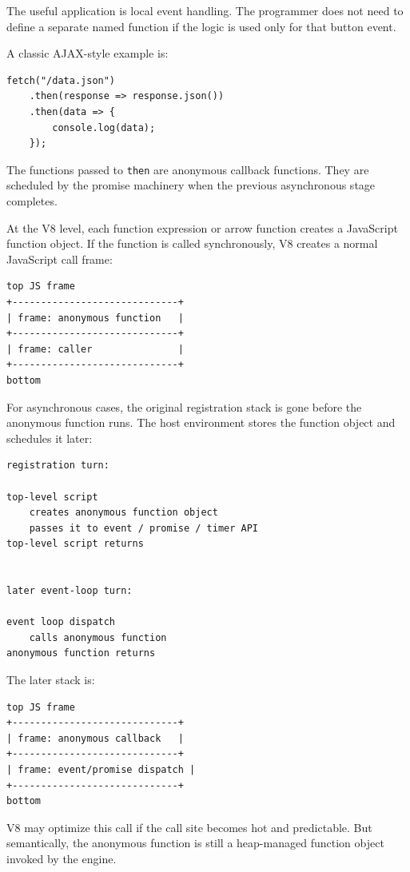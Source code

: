 The useful application is local event handling. The programmer does not need to define a separate named function if the logic is used only for that button event.

A classic AJAX-style example is:

\begin{verbatim}
fetch("/data.json")
    .then(response => response.json())
    .then(data => {
        console.log(data);
    });
\end{verbatim}

The functions passed to \texttt{then} are anonymous callback functions. They are scheduled by the promise machinery when the previous asynchronous stage completes.

At the V8 level, each function expression or arrow function creates a JavaScript function object. If the function is called synchronously, V8 creates a normal JavaScript call frame:

\begin{verbatim}
top JS frame
+-----------------------------+
| frame: anonymous function   |
+-----------------------------+
| frame: caller               |
+-----------------------------+
bottom
\end{verbatim}

For asynchronous cases, the original registration stack is gone before the anonymous function runs. The host environment stores the function object and schedules it later:

\begin{verbatim}
registration turn:

top-level script
    creates anonymous function object
    passes it to event / promise / timer API
top-level script returns


later event-loop turn:

event loop dispatch
    calls anonymous function
anonymous function returns
\end{verbatim}

The later stack is:

\begin{verbatim}
top JS frame
+-----------------------------+
| frame: anonymous callback   |
+-----------------------------+
| frame: event/promise dispatch |
+-----------------------------+
bottom
\end{verbatim}

V8 may optimize this call if the call site becomes hot and predictable. But semantically, the anonymous function is still a heap-managed function object invoked by the engine.

